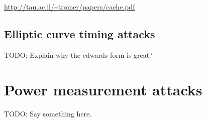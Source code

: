 \documentclass[11pt,ebook,table,dvipsnames]{memoir}
\begin{document}
\url{http://tau.ac.il/~tromer/papers/cache.pdf}
\subsection{Elliptic curve timing attacks}
\label{sec-4-3-1-2}

TODO: Explain why the edwards form is great?
\section{Power measurement attacks}
\label{sec-4-3-2}
TODO: Say something here.




\glsaddall
\printglossaries
\end{document}
